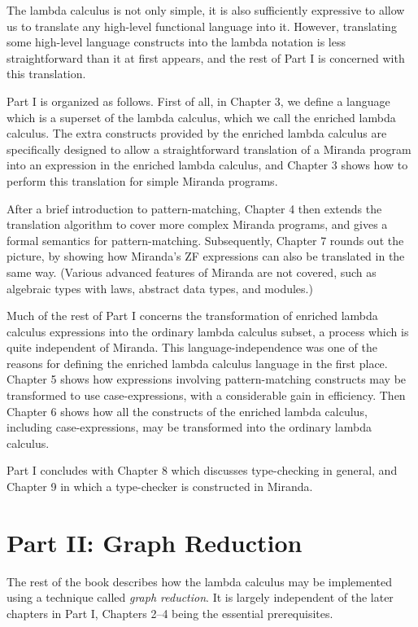 The lambda calculus is not only simple, it is also sufficiently expressive to
allow us to translate any high-level functional language into it. However,
translating some high-level language constructs into the lambda notation is
less straightforward than it at first appears, and the rest of Part I is concerned
with this translation.

Part I is organized as follows. First of all, in Chapter 3, we define a language
which is a superset of the lambda calculus, which we call the enriched lambda
calculus. The extra constructs provided by the enriched lambda calculus are
specifically designed to allow a straightforward translation of a Miranda
program into an expression in the enriched lambda calculus, and Chapter 3
shows how to perform this translation for simple Miranda programs.

After a brief introduction to pattern-matching, Chapter 4 then extends the
translation algorithm to cover more complex Miranda programs, and gives a
formal semantics for pattern-matching. Subsequently, Chapter 7 rounds out
the picture, by showing how Miranda's ZF expressions can also be translated
in the same way. (Various advanced features of Miranda are not covered,
such as algebraic types with laws, abstract data types, and modules.)

Much of the rest of Part I concerns the transformation of enriched lambda
calculus expressions into the ordinary lambda calculus subset, a process which
is quite independent of Miranda. This language-independence was one of the
reasons for defining the enriched lambda calculus language in the first place.
Chapter 5 shows how expressions involving pattern-matching constructs may
be transformed to use case-expressions, with a considerable gain in efficiency.
Then Chapter 6 shows how all the constructs of the enriched lambda calculus,
including case-expressions, may be transformed into the ordinary lambda
calculus.

Part I concludes with Chapter 8 which discusses type-checking in general,
and Chapter 9 in which a type-checker is constructed in Miranda.

\section{Part II: Graph Reduction}

The rest of the book describes how the lambda calculus may be implemented
using a technique called \textit{graph reduction}. It is largely independent of the later
chapters in Part I, Chapters 2--4 being the essential prerequisites.

